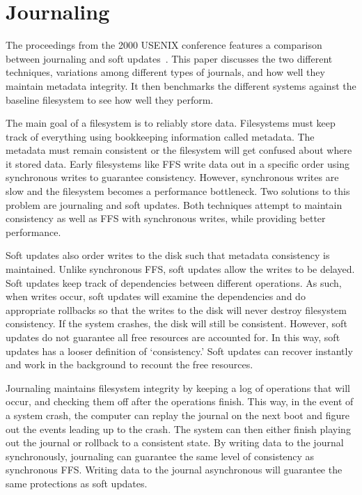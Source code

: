 \section{Journaling}

The proceedings from the 2000 USENIX conference features a comparison
between journaling and soft updates~\cite{seltzer00journaling}. This
paper discusses the two different techniques, variations among
different types of journals, and how well they maintain metadata
integrity. It then benchmarks the different systems against the
baseline filesystem to see how well they perform.

The main goal of a filesystem is to reliably store data. Filesystems
must keep track of everything using bookkeeping information called
metadata. The metadata must remain consistent or the filesystem will
get confused about where it stored data. Early filesystems like FFS
write data out in a specific order using synchronous writes to
guarantee consistency. However, synchronous writes are slow and the
filesystem becomes a performance bottleneck. Two solutions to this
problem are journaling and soft updates. Both techniques attempt to
maintain consistency as well as FFS with synchronous writes, while
providing better performance.

Soft updates also order writes to the disk such that metadata
consistency is maintained. Unlike synchronous FFS, soft updates allow
the writes to be delayed.  Soft updates keep track of dependencies
between different operations. As such, when writes occur, soft updates
will examine the dependencies and do appropriate rollbacks so that the
writes to the disk will never destroy filesystem consistency. If the
system crashes, the disk will still be consistent. However, soft
updates do not guarantee all free resources are accounted for. In this
way, soft updates has a looser definition of `consistency.' Soft
updates can recover instantly and work in the background to recount
the free resources.

Journaling maintains filesystem integrity by keeping a log of
operations that will occur, and checking them off after the operations
finish. This way, in the event of a system crash, the computer can
replay the journal on the next boot and figure out the events leading
up to the crash. The system can then either finish playing out the
journal or rollback to a consistent state. By writing data to the
journal synchronously, journaling can guarantee the same level of
consistency as synchronous FFS. Writing data to the journal
asynchronous will guarantee the same protections as soft updates.

